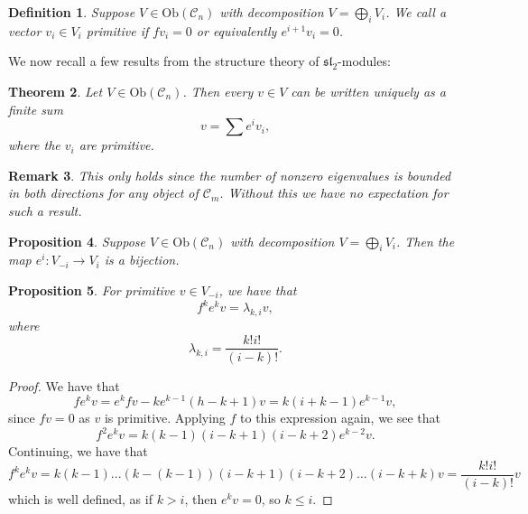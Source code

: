 \documentclass{amsart}
\newcommand{\ra}{\rightarrow}
\newtheorem{theorem}{Theorem}
\newtheorem{definition}[theorem]{Definition}
\newtheorem{prop}[theorem]{Proposition}
\newtheorem{remark}[theorem]{Remark}
\theoremstyle{definition}
\begin{document}
 \begin{definition}
     Suppose $V \in \mathrm{Ob}(\mathscr{C}_n)$ with decomposition $V = \bigoplus_i V_i$. We call a vector $v_i \in V_i$ primitive if $fv_i=0$ or equivalently $e^{i+1}v_i=0$.
 \end{definition}
 We now recall a few results from the structure theory of $\mathfrak{sl}_2$-modules:
 \begin{theorem}
     Let $V \in \mathrm{Ob}(\mathscr{C}_n)$. Then every $v \in V$ can be written uniquely as a finite sum
         \begin{equation*}
             v = \sum e^i v_i,
         \end{equation*}
         where the $v_i$ are primitive.
 \end{theorem}
 \begin{remark}
     This only holds since the number of nonzero eigenvalues is bounded in both directions for any object of $\mathscr{C}_m$. Without this we have no expectation for such a result.
 \end{remark}
 \begin{prop}
     Suppose $V \in \mathrm{Ob}(\mathscr{C}_n)$ with decomposition $V = \bigoplus_i V_i$. Then the map $e^i:V_{-i} \ra V_i$ is a bijection.
 \end{prop}
 \begin{prop}
    For primitive $v \in V_{-i}$, we have that
    \begin{equation*}
        f^ke^k v= \lambda_{k,i} v,
    \end{equation*}
    where
    \begin{equation*}
        \lambda_{k,i} = \frac{k! i!}{(i-k)!}.
    \end{equation*}
\end{prop}
\begin{proof}
    We have that
    \begin{equation*}
        fe^kv =  e^kf v - ke^{k-1}(h-k+1)v = k(i+k-1)e^{k-1}v,
    \end{equation*}
    since $fv=0$ as $v$ is primitive. Applying $f$ to this expression again, we see that
    \begin{equation*}
        f^2e^kv = k(k-1)(i-k+1)(i-k+2) e^{k-2}v.
    \end{equation*}
    Continuing, we have that
    \begin{equation*}
        f^ke^k v = k(k-1)...(k-(k-1)) (i-k+1)(i-k+2) \dots (i-k+k) v = \frac{k! i!}{(i-k)!}v
    \end{equation*}
    which is well defined, as if $k> i$, then $e^kv=0$, so $k\leq i$.
\end{proof}
\end{document}
